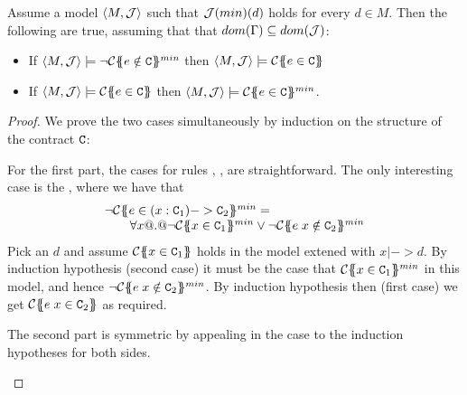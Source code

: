 \begin{lemma}\label{lem:contract-min} Assume a model $\langle M,\calI\rangle$ such that $\calI(min)(d)$ holds for every $d \in M$. 
Then the following are true, assuming that that $dom(\Gamma) \subseteq dom(\calI)$:
\begin{itemize} 
  \item If $\langle M,\calI\rangle \models \neg \ctransmin{}{\Gamma}{e \notin \Ct}$ then $\langle M,\calI\rangle\models \ctrans{}{\Gamma}{e \in \Ct}$
  \item If $\langle M,\calI\rangle \models \ctrans{}{\Gamma}{e \in \Ct}$ then $\langle M,\calI\rangle \models \ctransmin{}{\Gamma}{e \in \Ct}$.
\end{itemize}
\end{lemma}
\begin{proof} We prove the two cases simultaneously by induction on the structure of the contract $\Ct$:
\begin{itemize*}
  \item For the first part, the cases for rules , ,  are straightforward. The only 
        interesting case is the , where we have that 
        \[\begin{array}{l}
             \neg \ctransmin{}{\Gamma}{e \in (x : \Ct_1) -> \Ct_2}  = \\ 
             \quad\quad \forall x @.@ \neg \ctransmin{}{\Gamma,x}{x \in \Ct_1} \lor \neg \ctransmin{}{\Gamma,x}{e\;x \notin \Ct_2}
        \end{array}\]
        Pick an $d$ and assume $\ctrans{}{\Gamma,x}{x \in \Ct_1}$ holds in the model extened with $x |-> d$. 
        By induction hypothesis (second case) it must be the case that $\ctransmin{}{\Gamma,x}{x \in \Ct_1}$ in this model, and hence $\neg \ctransmin{}{\Gamma,x}{e\;x \notin \Ct_2}$.
        By induction hypothesis then (first case) we get $\ctrans{}{\Gamma,x}{e\;x \in \Ct_2}$ as required.
  \item The second part is symmetric by appealing in the  case to the induction hypotheses for both sides.
\end{itemize*} 
\end{proof}


